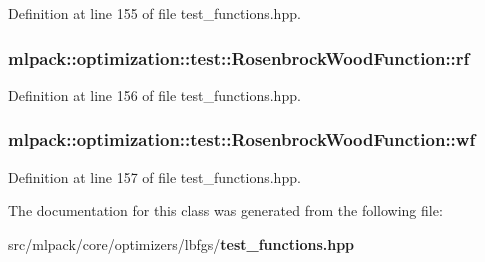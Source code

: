 Definition at line 155 of file test\+\_\+functions.\+hpp.

\subsubsection[{rf}]{ mlpack\+::optimization\+::test\+::\+Rosenbrock\+Wood\+Function\+::rf\hspace{0.3cm}{\ttfamily [private]}}\label{classmlpack_1_1optimization_1_1test_1_1RosenbrockWoodFunction_ac84bea4afa457ec97d671ceee56bc165}


Definition at line 156 of file test\+\_\+functions.\+hpp.

\subsubsection[{wf}]{ mlpack\+::optimization\+::test\+::\+Rosenbrock\+Wood\+Function\+::wf\hspace{0.3cm}{\ttfamily [private]}}\label{classmlpack_1_1optimization_1_1test_1_1RosenbrockWoodFunction_abcaa6f9433de5259df3e0b2f8e878123}


Definition at line 157 of file test\+\_\+functions.\+hpp.



The documentation for this class was generated from the following file\+:\begin{DoxyCompactItemize}
\item 
src/mlpack/core/optimizers/lbfgs/{\bf test\+\_\+functions.\+hpp}\end{DoxyCompactItemize}
